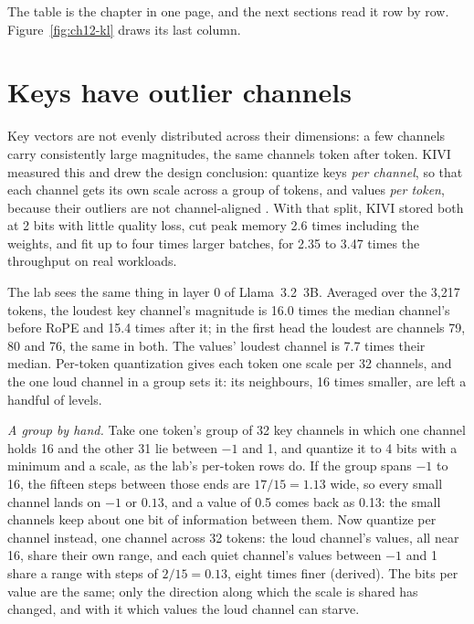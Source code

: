 \noindent The table is the chapter in one page, and the next sections read it
row by row. Figure~\ref{fig:ch12-kl} draws its last column.


\section{Keys have outlier channels}

Key vectors are not evenly distributed across their dimensions: a few channels
carry consistently large magnitudes, the same channels token after token. KIVI
measured this and drew the design conclusion: quantize keys \emph{per channel},
so that each channel gets its own scale across a group of tokens, and values
\emph{per token}, because their outliers are not channel-aligned
\cite{liu2024kivi}. With that split, KIVI stored both at 2 bits with little
quality loss, cut peak memory 2.6 times including the weights, and fit up to four
times larger batches, for 2.35 to 3.47 times the throughput on real workloads.

The lab sees the same thing in layer 0 of Llama~3.2~3B. Averaged over the 3,217
tokens, the loudest key channel's magnitude is 16.0 times the median channel's
before RoPE and 15.4 times after it; in the first head the loudest are channels
79, 80 and 76, the same in both. The values' loudest channel is 7.7 times their
median. Per-token quantization gives each token one scale per 32 channels, and
the one loud channel in a group sets it: its neighbours, 16 times smaller, are
left a handful of levels.

\emph{A group by hand.} Take one token's group of 32 key channels in which one
channel holds 16 and the other 31 lie between $-1$ and 1, and quantize it to 4
bits with a minimum and a scale, as the lab's per-token rows do. If the group
spans $-1$ to 16, the fifteen steps between those ends are $17/15 = 1.13$ wide,
so every small channel lands on $-1$ or $0.13$, and a value of 0.5 comes back as
0.13: the small channels keep about one bit of information between them. Now
quantize per channel instead, one channel across 32 tokens: the loud channel's
values, all near 16, share their own range, and each quiet channel's values
between $-1$ and 1 share a range with steps of $2/15 = 0.13$, eight times finer
(derived). The bits per value are the same; only the direction along which the
scale is shared has changed, and with it which values the loud channel can
starve.

